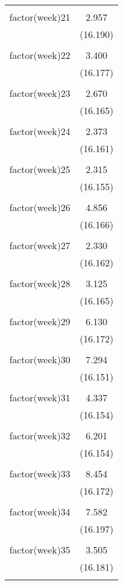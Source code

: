 \documentclass{article}
\begin{document}
\begin{table}[!htbp]
\begin{tabular}{@{\extracolsep{5pt}}lc}
  & \\ 
 factor(week)21 & 2.957 \\ 
  & (16.190) \\ 
  & \\ 
 factor(week)22 & 3.400 \\ 
  & (16.177) \\ 
  & \\ 
 factor(week)23 & 2.670 \\ 
  & (16.165) \\ 
  & \\ 
 factor(week)24 & 2.373 \\ 
  & (16.161) \\ 
  & \\ 
 factor(week)25 & 2.315 \\ 
  & (16.155) \\ 
  & \\ 
 factor(week)26 & 4.856 \\ 
  & (16.166) \\ 
  & \\ 
 factor(week)27 & 2.330 \\ 
  & (16.162) \\ 
  & \\ 
 factor(week)28 & 3.125 \\ 
  & (16.165) \\ 
  & \\ 
 factor(week)29 & 6.130 \\ 
  & (16.172) \\ 
  & \\ 
 factor(week)30 & 7.294 \\ 
  & (16.151) \\ 
  & \\ 
 factor(week)31 & 4.337 \\ 
  & (16.154) \\ 
  & \\ 
 factor(week)32 & 6.201 \\ 
  & (16.154) \\ 
  & \\ 
 factor(week)33 & 8.454 \\ 
  & (16.172) \\ 
  & \\ 
 factor(week)34 & 7.582 \\ 
  & (16.197) \\ 
  & \\ 
 factor(week)35 & 3.505 \\ 
  & (16.181) \\ 
  & \\ 

\end{tabular}
\end{table}
\end{document}
